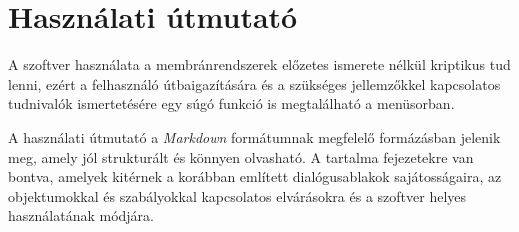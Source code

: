 \section{Használati útmutató}\label{help}

A szoftver használata a membránrendszerek előzetes ismerete nélkül kriptikus tud lenni, ezért a felhasználó útbaigazítására és a szükséges jellemzőkkel kapcsolatos tudnivalók ismertetésére egy súgó funkció is megtalálható a menüsorban.

A használati útmutató a \textit{Markdown} formátumnak megfelelő formázásban jelenik meg, amely jól strukturált és könnyen olvasható. A tartalma fejezetekre van bontva, amelyek kitérnek a korábban említett dialógusablakok sajátosságaira, az objektumokkal és szabályokkal kapcsolatos elvárásokra és a szoftver helyes használatának módjára.